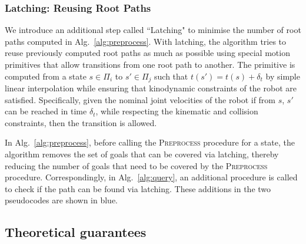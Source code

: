 \documentclass[conference]{IEEEtran}
\begin{document}
%

\subsubsection{Latching: Reusing Root Paths}
\label{latching}
We introduce an additional step called ``Latching" to minimise the number of root paths computed in Alg.~\ref{alg:preprocess}. With latching, the algorithm tries to reuse previously computed root paths as much as possible using special motion primitives that allow transitions from one root path to another.
The primitive is computed from a state $s \in \Pi_i$ to $s' \in \Pi_j$ such that $t(s') = t(s) + \delta_t$ by simple linear interpolation while ensuring that kinodynamic constraints of the robot are satisfied. Specifically, given the nominal joint velocities of the robot if from $s$, $s'$ can be reached in time $\delta_t$, while respecting the kinematic and collision constraints, then the transition is allowed.

In Alg.~\ref{alg:preprocess}, before calling the \textsc{Preprocess} procedure for a state, the algorithm removes the set of goals that can be covered via latching, thereby reducing the number of goals that need to be covered by the \textsc{Preprocess} procedure. Correspondingly, in Alg.~\ref{alg:query}, an additional procedure is called to check if the path can be found via latching. These additions in the two pseudocodes are shown in blue.

\subsection{Theoretical guarantees}
\end{document}
